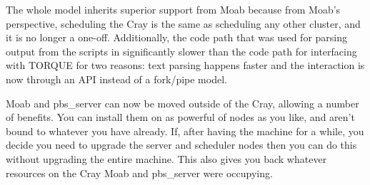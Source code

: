 \documentclass[10pt, conference, compsocconf]{IEEEtran}
\begin{document}
The whole model inherits superior support from Moab because from Moab's perspective, scheduling 
the Cray is the same as scheduling any other cluster, and it is no longer a one-off. Additionally,
the code path that was used for parsing output from the scripts in significantly slower than the 
code path for interfacing with TORQUE for two reasons: text parsing happens faster and the interaction
is now through an API instead of a fork/pipe model.

Moab and pbs_server can now be moved outside of the Cray, allowing a number of benefits. You can
install them on as powerful of nodes as you like, and aren't bound to whatever you have already.
If, after having the machine for a while, you decide you need to upgrade the server and scheduler
nodes then you can do this without upgrading the entire machine. This also gives you back whatever
resources on the Cray Moab and pbs_server were occupying. 












\end{document}
